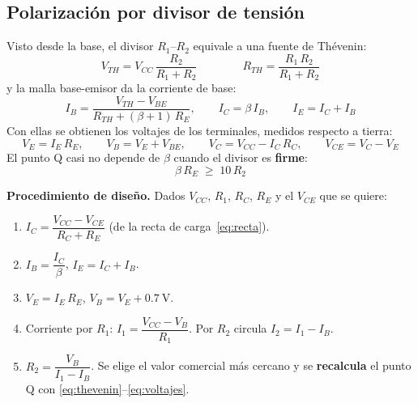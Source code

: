 \documentclass[11pt,a4paper]{article}
\begin{document}
\subsection{Polarización por divisor de tensión}
Visto desde la base, el divisor $R_1$--$R_2$ equivale a una fuente de Thévenin:
\begin{equation}
  V_{TH} = V_{CC}\,\frac{R_2}{R_1 + R_2}
  \qquad\qquad
  R_{TH} = \frac{R_1\,R_2}{R_1 + R_2}
  \label{eq:thevenin}
\end{equation}
y la malla base-emisor da la corriente de base:
\begin{equation}
  I_B = \frac{V_{TH} - V_{BE}}{R_{TH} + (\beta+1)\,R_E},
  \qquad
  I_C = \beta\,I_B,
  \qquad
  I_E = I_C + I_B
  \label{eq:ib}
\end{equation}
Con ellas se obtienen los voltajes de los terminales, medidos respecto a tierra:
\begin{equation}
  V_E = I_E\,R_E,
  \qquad
  V_B = V_E + V_{BE},
  \qquad
  V_C = V_{CC} - I_C\,R_C,
  \qquad
  V_{CE} = V_C - V_E
  \label{eq:voltajes}
\end{equation}
El punto Q casi no depende de $\beta$ cuando el divisor es \textbf{firme}:
\begin{equation}
  \beta\,R_E \;\geq\; 10\,R_2
  \label{eq:firme}
\end{equation}

\noindent\textbf{Procedimiento de diseño.} Dados $V_{CC}$, $R_1$, $R_C$, $R_E$ y el
$V_{CE}$ que se quiere:
\begin{enumerate}[label=\arabic*), leftmargin=*, itemsep=3pt]
  \item $I_C = \dfrac{V_{CC} - V_{CE}}{R_C + R_E}$ \quad (de la recta de
        carga~\eqref{eq:recta}).
  \item $I_B = \dfrac{I_C}{\beta}$, \quad $I_E = I_C + I_B$.
  \item $V_E = I_E\,R_E$, \quad $V_B = V_E + \qty{0.7}{\volt}$.
  \item Corriente por $R_1$: \quad $I_1 = \dfrac{V_{CC} - V_B}{R_1}$. \quad Por $R_2$ circula
        $I_2 = I_1 - I_B$.
  \item $R_2 = \dfrac{V_B}{I_1 - I_B}$. \quad Se elige el valor comercial más cercano y se
        \textbf{recalcula} el punto Q con \eqref{eq:thevenin}--\eqref{eq:voltajes}.
\end{enumerate}
\end{document}

